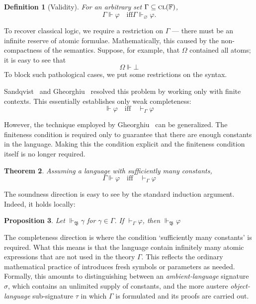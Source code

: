 \documentclass[reqno]{asl}
\newtheorem{definition}{Definition}
\newtheorem{proposition}[definition]{Proposition}
\newtheorem{theorem}[definition]{Theorem}
\newcommand{\closure}{\textsc{cl}}
\newcommand{\setClosedFormulas}{\closure(\setFormulas)}
\newcommand{\setFormulas}{\mathbb{F}}
\newcommand{\supp}{\Vdash}
\newcommand{\base}[1]{\mathfrak{#1}}
\renewcommand{\phi}{\varphi}
\renewcommand{\emptyset}{\varnothing}
\begin{document}
\begin{definition}[Validity]
For an arbitrary set $\Gamma \subseteq \setClosedFormulas$,
\[
    \Gamma \supp \varphi 
    \quad \text{iff} \Gamma \supp_{\emptyset} \varphi.
\]
\end{definition}

To recover classical logic, we require a restriction on $\Gamma$ --- there must be an infinite reserve of atomic formulae. Mathematically, this caused by the non-compactness of the semantics. Suppose, for example, that $\Omega$ contained all atoms; it is easy to see that 
\[
\Omega \supp \bot
\]
To block such pathological cases, we put some restrictions on the syntax.

Sandqvist~\cite{Sandqvist2005inferentialist,Sandqvist_2009} and Gheorghiu~\cite{gheorghiu2025fol} resolved this problem by working only with finite contexts. This essentially establishes only weak completeness:
\[
     \supp \varphi 
    \quad \text{iff} \quad \vdash_\Gamma \varphi
\]

However, the technique employed by Gheorghiu~\cite{gheorghiu2025fol} can be generalized. The finiteness condition is required only to guarantee that there are enough constants in the language. Making this the condition explicit and the finiteness condition itself is no longer required. 

\begin{theorem}\label{thm:snc}
Assuming a language with sufficiently many constants,
\[
\Gamma \supp \varphi \quad \text{iff} \quad  \vdash_\Gamma \varphi
\]
\end{theorem}

The soundness direction is easy to see by the standard induction argument. Indeed, it holds locally:

\begin{proposition} \label{prop:local-soundness}
Let $\supp_{\base{B}} \gamma$ for $\gamma \in \Gamma$. If $\vdash_{\Gamma} \phi$, then $\supp_{\base{B}} \phi$
\end{proposition}

The completeness direction is where the condition  `sufficiently many constants' is required. What this means is that the language contain infinitely many atomic expressions that are not used in the theory $\Gamma$. This reflects the ordinary mathematical practice of introduces fresh symbols or parameters as needed. Formally, this amounts to distinguishing between an \emph{ambient-language} signature $\sigma$, which contains an unlimited supply of constants, and the more austere \emph{object-language} sub-signature $\tau$ in which $\Gamma$ is formulated and its proofs are carried out.
\end{document}
